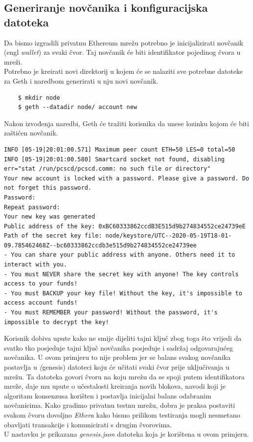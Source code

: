 \documentclass[times, utf8, zavrsni, numeric]{fer}
\begin{document}
\subsection{Generiranje novčanika i konfiguracijska datoteka}
Da bismo izgradili privatnu Ethereum mrežu potrebno je inicijalizirati novčanik (engl \emph{wallet}) za svaki čvor. Taj novčanik
će biti identifikator pojedinog čvora u mreži. \\
Potrebno je kreirati novi direktorij u kojem će se nalaziti sve potrebne datoteke za Geth i naredbom generirati u nju novi novčanik.

\begin{lstlisting}
    $ mkdir node
    $ geth --datadir node/ account new
\end{lstlisting}

Nakon izvođenja naredbi, Geth će tražiti korisnika da unese lozinku kojom će biti zaštićen novčanik.

\begin{lstlisting}
INFO [05-19|20:01:00.571] Maximum peer count ETH=50 LES=0 total=50
INFO [05-19|20:01:00.580] Smartcard socket not found, disabling err="stat /run/pcscd/pcscd.comm: no such file or directory"
Your new account is locked with a password. Please give a password. Do not forget this password.
Password: 
Repeat password: 
Your new key was generated
Public address of the key: 0xBC60333862ccdB3E515d9b274834552ce24739eE
Path of the secret key file: node/keystore/UTC--2020-05-19T18-01-09.785462468Z--bc60333862ccdb3e515d9b274834552ce24739ee
- You can share your public address with anyone. Others need it to interact with you.
- You must NEVER share the secret key with anyone! The key controls access to your funds!
- You must BACKUP your key file! Without the key, it's impossible to access account funds!
- You must REMEMBER your password! Without the password, it's impossible to decrypt the key!
\end{lstlisting}

Korisnik dobiva upute kako ne smije dijeliti tajni ključ zbog toga što vrijedi da svatko tko posjeduje tajni ključ novčanika
posjeduje i sadržaj odgovarajućeg novčanika. U ovom primjeru to nije problem jer se balans svakog novčanika postavlja u \emph(genesis)
datoteci koju će učitati svaki čvor prije uključivanja u mrežu. Ta datoteka govori čvoru na koju mrežu da se spoji putem identifikatora
mreže, daje mu upute o učestalosti kreiranja novih blokova, navodi koji je algoritam konsenzusa korišten i postavlja inicijalni balans
odabranim novčanicima. Kako gradimo privatnu testnu mrežu, dobra je praksa postaviti svakom čvoru dovoljno \emph{Ethera} kako bismo
prilikom testiranja mogli nesmetano obavljati transakcije i komunicirati s drugim čvorovima. \\
U nastavku je prikazana \emph{genesis.json} datoteka koja je korištena u ovom primjeru.
\end{document}
